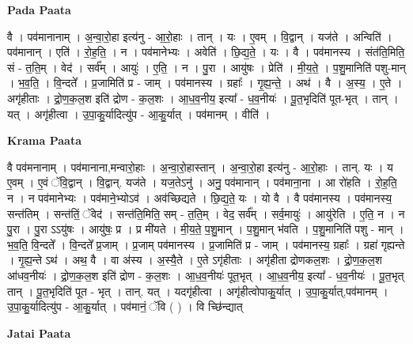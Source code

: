 \documentclass[17pt]{extarticle}
\begin{document}
\textbf{Pada Paata} \newline

वै । पव॑मानानाम् । अ॒न्वा॒रो॒हा इत्य॑नु - आ॒रो॒हाः । तान् । यः । ए॒वम् । वि॒द्वान् । यज॑ते । अन्विति॑ । पव॑मानान् । एति॑ । रो॒ह॒ति॒ । न । पव॑मानेभ्यः । अवेति॑ । छि॒द्य॒ते॒ । यः । वै । पव॑मानस्य । संत॑ति॒मिति॒ सं - त॒ति॒म् । वेद॑ । सर्व᳚म् । आयुः॑ । ए॒ति॒ । न । पु॒रा । आयु॑षः । प्रेति॑ । मी॒य॒ते॒ । प॒शु॒मानिति॑ पशु-मान् । भ॒व॒ति॒ । वि॒न्दते᳚ । प्र॒जामिति॑ प्र - जाम् । पव॑मानस्य । ग्रहाः᳚ । गृ॒ह्य॒न्ते॒ । अथ॑ । वै । अ॒स्य॒ । ए॒ते । अगृ॑हीताः । द्रो॒ण॒क॒ल॒श इति॑ द्रोण - क॒ल॒शः । आ॒ध॒व॒नीय॒ इत्या᳚ - ध॒व॒नीयः॑ । पू॒त॒भृदिति॑ पूत-भृत् । तान् । यत् । अगृ॑हीत्वा । उ॒पा॒कु॒र्यादित्यु॑प - आ॒कु॒र्यात् । पव॑मानम् । वीति॑ ।  \newline


\textbf{Krama Paata} \newline

वै पव॑मनानाम् । पव॑मानाना,मन्वारो॒हाः । अ॒न्वा॒रो॒हास्तान् । अ॒न्वा॒रो॒हा इत्य॑नु - आ॒रो॒हाः । तान्. यः । य ए॒वम् । ए॒वं ॅवि॒द्वान् । वि॒द्वान्. यज॑ते । यज॒तेऽनु॑ । अनु॒ पव॑मानान् । पव॑माना॒ना । आ रो॑हति । रो॒ह॒ति॒ न । न पव॑मानेभ्यः । पव॑माने॒भ्योऽव॑ । अव॑च्छिद्यते । छि॒द्य॒ते॒ यः । यो वै । वै पव॑मानस्य । पव॑मानस्य॒ सन्त॑तिम् । सन्त॑तिं॒ ॅवेद॑ । सन्त॑ति॒मिति॒ सम् - त॒ति॒म् । वेद॒ सर्व᳚म् । सर्व॒मायुः॑ । आयु॑रेति । ए॒ति॒ न । न पु॒रा । पु॒रा ऽऽयु॑षः । आयु॑षः॒ प्र । प्र मी॑यते । मी॒य॒ते॒ प॒शु॒मान् । प॒शु॒मान् भ॑वति । प॒शु॒मानिति॑ पशु - मान् । भ॒व॒ति॒ वि॒न्दते᳚ । वि॒न्दते᳚ प्र॒जाम् । प्र॒जाम् पव॑मानस्य । प्र॒जामिति॑ प्र - जाम् । पव॑मानस्य॒ ग्रहाः᳚ । ग्रहा॑ गृह्यन्ते । गृ॒ह्य॒न्ते ऽथ॑ । अथ॒ वै । वा अ॑स्य । अ॒स्यै॒ते । ए॒ते ऽगृ॑हीताः । अगृ॑हीता द्रोणकल॒शः । द्रो॒ण॒क॒ल॒श आ॑धव॒नीयः॑ । द्रो॒ण॒क॒ल॒श इति॑ द्रोण - क॒ल॒शः । आ॒ध॒व॒नीयः॑ पूत॒भृत् । आ॒ध॒व॒नीय॒ इत्या᳚ - ध॒व॒नीयः॑ । पू॒त॒भृत् तान् । पू॒त॒भृदिति॑ पूत - भृत् । तान्. यत् । यदगृ॑हीत्वा । अगृ॑हीत्वोपाकु॒र्यात् । उ॒पा॒कु॒र्यात्,पव॑मानम् । उ॒पा॒कु॒र्यादित्यु॑प - आ॒कु॒र्यात् । पव॑मानं॒ ॅवि ( ) । वि च्छि॑न्द्यात् \newline

\textbf{Jatai Paata} \newline
\end{document}

